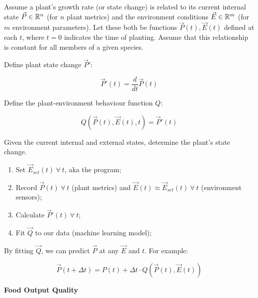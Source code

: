 \documentclass{report}
\begin{document}
Assume a plant's growth rate (or state change) is related to its current internal state $\vec P \in \mathbb R^n$ (for $n$ plant metrics) and the environment conditions $\vec E \in \mathbb R^m$ (for $m$ environment parameters). Let these both be functions $\vec P (t),\vec E(t)$ defined at each $t$, where $t=0$ indicates the time of planting. Assume that this relationship is constant for all members of a given species.

\newpage

Define plant state change $\vec P'$: 

$$\vec P'(t) = \frac{d}{dt}\vec P(t)$$

Define the plant-environment behaviour function $Q$: 

$$Q(\vec P(t), \vec E(t), t)=\vec P'(t)$$ 

Given the current internal and external states, determine the plant's state change.

\begin{enumerate}
    \item Set $\vec E_{set}(t)~\forall~ t$, aka the program;
    \item Record $\vec P(t)~\forall~ t$ (plant metrics) and $\vec E(t)\approx \vec E_{set}(t)~\forall~ t$ (environment sensors);
    \item Calculate $\vec P'(t)~\forall~ t$;
    \item Fit $\vec Q$ to our data (machine learning model);
\end{enumerate}

By fitting $\vec Q$, we can predict $\vec P$ at any $\vec E$ and $t$. For example:

$$\vec P(t+\Delta t)=P(t)+\Delta t\cdot Q(\vec P(t),\vec E(t))$$

\textbf{Food Output Quality}




\end{document}
